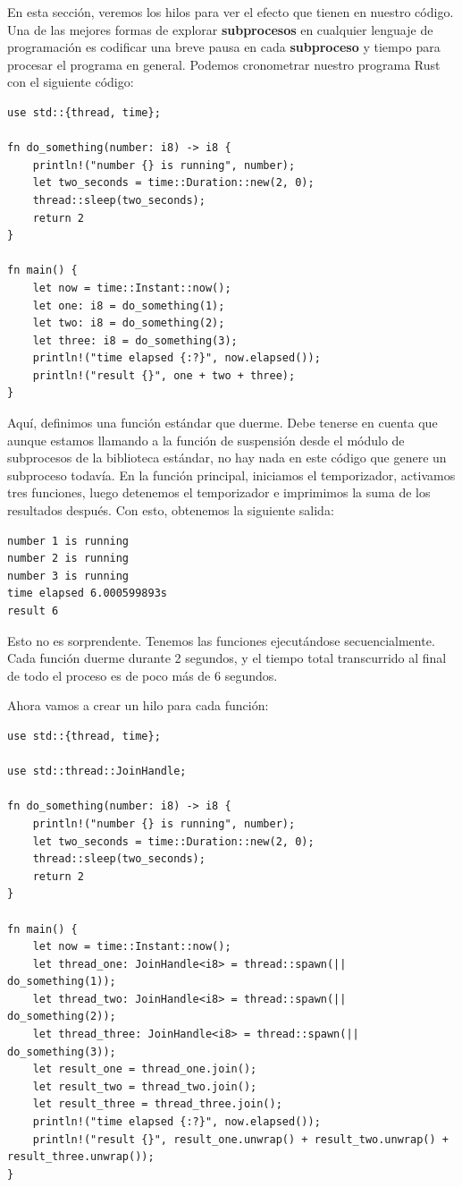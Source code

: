 En esta sección, veremos los hilos para ver el efecto que tienen en nuestro código. Una de las mejores formas de explorar \textbf{subprocesos} en cualquier lenguaje de programación es codificar una breve pausa en cada \textbf{subproceso} y tiempo para procesar el programa en general. Podemos cronometrar nuestro programa Rust con el siguiente código:

\begin{lstlisting}
use std::{thread, time};

fn do_something(number: i8) -> i8 {
	println!("number {} is running", number);
	let two_seconds = time::Duration::new(2, 0);
	thread::sleep(two_seconds);
	return 2
}

fn main() {
	let now = time::Instant::now();
	let one: i8 = do_something(1);
	let two: i8 = do_something(2);
	let three: i8 = do_something(3);
	println!("time elapsed {:?}", now.elapsed());
	println!("result {}", one + two + three);
}
\end{lstlisting}

Aquí, definimos una función estándar que duerme. Debe tenerse en cuenta que aunque estamos llamando a la función de suspensión desde el módulo de subprocesos de la biblioteca estándar, no hay nada en este código que genere un subproceso todavía. En la función principal, iniciamos el temporizador, activamos tres funciones, luego detenemos el temporizador e imprimimos la suma de los resultados después. Con esto, obtenemos la siguiente salida:

\begin{lstlisting}
number 1 is running
number 2 is running
number 3 is running
time elapsed 6.000599893s
result 6
\end{lstlisting}

Esto no es sorprendente. Tenemos las funciones ejecutándose secuencialmente. Cada función duerme durante 2 segundos, y el tiempo total transcurrido al final de todo el proceso es de poco más de 6 segundos.

Ahora vamos a crear un hilo para cada función:


\begin{lstlisting}
use std::{thread, time};

use std::thread::JoinHandle;

fn do_something(number: i8) -> i8 {
	println!("number {} is running", number);
	let two_seconds = time::Duration::new(2, 0);
	thread::sleep(two_seconds);
	return 2
}

fn main() {
	let now = time::Instant::now();
	let thread_one: JoinHandle<i8> = thread::spawn(|| do_something(1));
	let thread_two: JoinHandle<i8> = thread::spawn(|| do_something(2));
	let thread_three: JoinHandle<i8> = thread::spawn(|| do_something(3));
	let result_one = thread_one.join();
	let result_two = thread_two.join();
	let result_three = thread_three.join();
	println!("time elapsed {:?}", now.elapsed());
	println!("result {}", result_one.unwrap() + result_two.unwrap() + result_three.unwrap());
}
\end{lstlisting}

